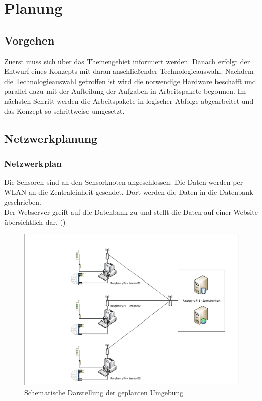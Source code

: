 \chapter{Planung}

\section*{Vorgehen} %

Zuerst muss sich über das Themengebiet informiert werden. Danach erfolgt der
Entwurf eines Konzepts mit daran anschließender Technologieauswahl. Nachdem die
Technologieauswahl getroffen ist wird die notwendige Hardware beschafft und
parallel dazu mit der Aufteilung der Aufgaben in Arbeitspakete begonnen. Im
nächsten Schritt werden die Arbeitspakete in logischer Abfolge abgearbeitet und
das Konzept so schrittweise umgesetzt.

\section{Netzwerkplanung}

\subsection{Netzwerkplan}
Die Sensoren sind an den Sensorknoten angeschlossen. Die Daten werden per WLAN
an die Zentraleinheit gesendet. Dort werden die Daten in die Datenbank
geschrieben.\\
Der Webserver greift auf die Datenbank zu und stellt die Daten auf einer Website
übersichtlich dar. ()

\begin{figure} [htb]
\begin{centering}
\includegraphics[scale=0.4]{Bilder/Netzplan.pdf}
\caption[Schematische Darstellung der geplanten Umgebung]{Schematische
Darstellung der geplanten Umgebung}
\label{Darstellung_Umgebung}
\end{centering}
\end{figure} 

